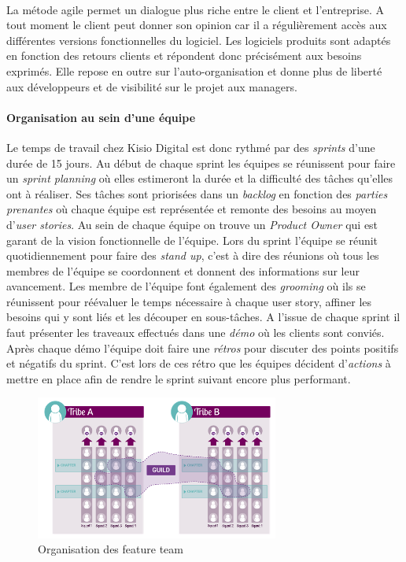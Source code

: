 \documentclass[a4paper]{report}
\begin{document}
\paragraph{} La métode agile permet un dialogue plus riche entre le client et l'entreprise. A tout moment le client peut donner son opinion car il a régulièrement accès aux différentes versions fonctionnelles du logiciel. Les logiciels produits sont adaptés en fonction des retours clients et répondent donc précisément aux besoins exprimés. Elle repose en outre sur l'auto-organisation et donne plus de liberté aux développeurs et de visibilité sur le projet aux managers.


\paragraph {Organisation au sein d'une équipe} Le temps de travail chez Kisio Digital est donc rythmé par des \emph{sprints} d'une durée de 15 jours. Au début de chaque sprint les équipes se réunissent pour faire un \emph{sprint planning} où elles estimeront la durée et la difficulté des tâches qu'elles ont à réaliser. Ses tâches sont priorisées dans un \emph{backlog} en fonction des \emph{parties prenantes} où chaque équipe est représentée et remonte des besoins au moyen d'\emph{user stories}. Au sein de chaque équipe on trouve un \emph{Product Owner} qui est garant de la vision fonctionnelle de l'équipe. Lors du sprint l'équipe se réunit quotidiennement pour faire des \emph{stand up}, c'est à dire des réunions où tous les membres de l'équipe se coordonnent et donnent des informations sur leur avancement. Les membre de l'équipe font également des \emph{grooming} où ils se réunissent pour réévaluer le temps nécessaire à chaque user story, affiner les besoins qui y sont liés et les découper en sous-tâches. A l'issue de chaque sprint il faut présenter les traveaux effectués dans une \emph{démo} où les clients sont conviés. Après chaque démo l'équipe doit faire une \emph{rétros} pour discuter des points positifs et négatifs du sprint. C'est lors de ces rétro que les équipes décident d'\emph{actions} à mettre en place afin de rendre le sprint suivant encore plus performant.

\begin{figure}
		\includegraphics[width=8cm]{image/feature_team}
		\caption{Organisation des feature team}
		\label{Organisation des feature team}
\end{figure}
\end{document}
